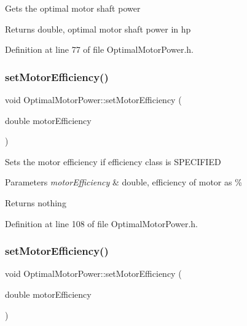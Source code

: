 Gets the optimal motor shaft power

\begin{DoxyReturn}{Returns}
double, optimal motor shaft power in hp 
\end{DoxyReturn}


Definition at line 77 of file Optimal\+Motor\+Power.\+h.

\mbox{\label{class_optimal_motor_power_a297acce2fcd06a57108fb52058a61cac}} 
\subsubsection{\texorpdfstring{set\+Motor\+Efficiency()}{setMotorEfficiency()}\hspace{0.1cm}{\footnotesize\ttfamily [1/3]}}
{\footnotesize\ttfamily void Optimal\+Motor\+Power\+::set\+Motor\+Efficiency (\begin{DoxyParamCaption}\item[{double}]{motor\+Efficiency }\end{DoxyParamCaption})\hspace{0.3cm}{\ttfamily [inline]}}

Sets the motor efficiency if efficiency class is S\+P\+E\+C\+I\+F\+I\+ED


\begin{DoxyParams}{Parameters}
{\em motor\+Efficiency} & double, efficiency of motor as \%\\
\hline
\end{DoxyParams}
\begin{DoxyReturn}{Returns}
nothing 
\end{DoxyReturn}


Definition at line 108 of file Optimal\+Motor\+Power.\+h.

\mbox{\label{class_optimal_motor_power_a297acce2fcd06a57108fb52058a61cac}} 
\subsubsection{\texorpdfstring{set\+Motor\+Efficiency()}{setMotorEfficiency()}\hspace{0.1cm}{\footnotesize\ttfamily [2/3]}}
{\footnotesize\ttfamily void Optimal\+Motor\+Power\+::set\+Motor\+Efficiency (\begin{DoxyParamCaption}\item[{double}]{motor\+Efficiency }\end{DoxyParamCaption})\hspace{0.3cm}{\ttfamily [inline]}}


